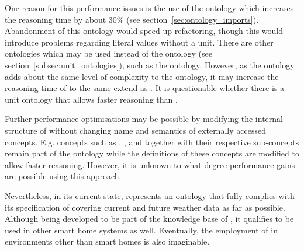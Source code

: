 One reason for this performance issues is the use of the \muo ontology which increases the reasoning time by about $30 \%$ (see section~\ref{sec:ontology_imports}). Abandonment of this ontology would speed up refactoring, though this would introduce problems regarding literal values without a unit. There are other ontologies which may be used instead of the \muo ontology (see section~\ref{subsec:unit_ontologies}), such as the  ontology. However, as the  ontology adds about the same level of complexity to the ontology, it may increase the reasoning time of \thinkhome to the same extend as \muo. It is questionable whether there is a unit ontology that allows faster reasoning than \muo.

Further performance optimisations may be possible by modifying the internal structure of \thinkhome without changing name and semantics of externally accessed concepts. E.g. concepts such as , , and  together with their respective sub-concepts remain part of the ontology while the definitions of these concepts are modified to allow faster reasoning. However, it is unknown to what degree performance gains are possible using this approach.

\vspace{1cm}

Nevertheless, in its current state, \thinkhomeweather represents an ontology that fully complies with its specification of covering current and future weather data as far as possible. Although being developed to be part of the knowledge base of \thinkhome, it qualifies to be used in other smart home systems as well. Eventually, the employment of \thinkhomeweather in environments other than smart homes is also imaginable.

\begin{comment}
Chapters ?, ? and ? describe some of the shortcomings that come with OWL and all ontologies being used by \thinkhomeweather. The main problems arising are:

\begin{itemize}
  \item First problem.
  \item Second problem.
\end{itemize}

OWL will have a long way to go to overcome these shortcomings in order to further ease definition of ontologies that handle specific domains.


As discussed in section ?, the performance is not the yellow from the egg.

Use a different reasoner? (Modifications needed)

Change the internal structure without altering symbols that are used internally.

Eliminate unnecessary terms.

\end{comment}